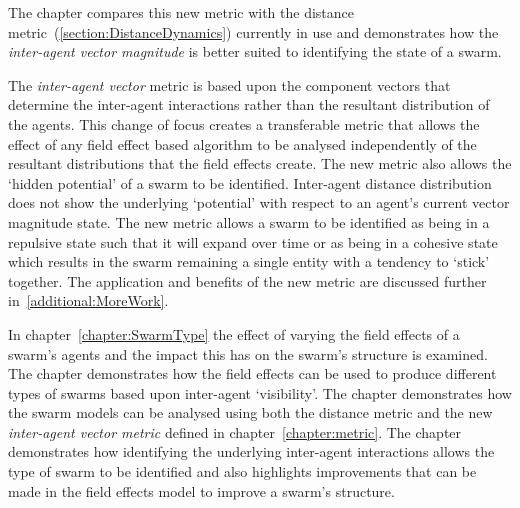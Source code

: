 The chapter compares this new metric with the distance metric~(\autoref{section:DistanceDynamics}) currently in use and demonstrates how the \textit{inter-agent vector magnitude} is better suited to identifying the state of a swarm.  


The \textit{inter-agent vector} metric is based upon the component vectors that determine the inter-agent interactions rather than the resultant distribution of the agents. This change of focus creates a transferable metric that allows the effect of any field effect based algorithm to be analysed independently of the resultant distributions that the field effects create. The new metric also allows the `hidden potential' of a swarm to be identified. Inter-agent distance distribution does not show the underlying `potential' with respect to an agent's current vector magnitude state. The new metric allows a swarm to be identified as being in a repulsive state such that it will expand over time or as being in a cohesive state which results in the swarm remaining a single entity with a tendency to `stick' together. The application and benefits of the new metric are discussed further in~\autoref{additional:MoreWork}.

In chapter~\ref{chapter:SwarmType} the effect of varying the field effects of a swarm's agents and the impact this has on the swarm's structure is examined. The chapter demonstrates how the field effects can be used to produce different types of swarms based upon inter-agent `visibility'. The chapter demonstrates how the swarm models can be analysed using both the distance metric and the new \textit{inter-agent vector metric} defined in chapter~\ref{chapter:metric}. The chapter demonstrates how identifying the underlying inter-agent interactions allows the type of swarm to be identified and also highlights improvements that can be made in the field effects model to improve a swarm's structure. 

